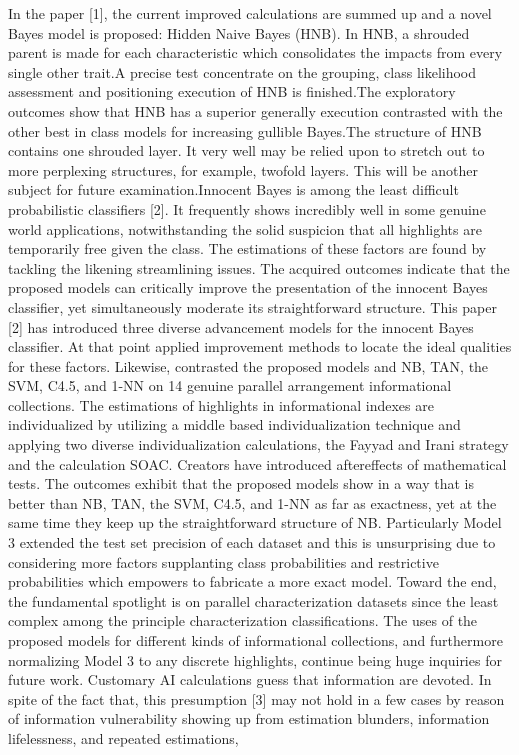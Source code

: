\documentclass[letterpaper,12pt]{article}
\begin{document}
In the paper [1], the current improved calculations are summed up and a novel Bayes model is proposed: Hidden Naive Bayes (HNB). In HNB, a shrouded parent is made for each characteristic which consolidates the impacts from every single other trait.A precise test concentrate on the grouping, class likelihood assessment and positioning execution of HNB is finished.The exploratory outcomes show that HNB has a superior generally execution contrasted with the other best in class models for increasing gullible Bayes.The structure of HNB contains one shrouded layer. It very well may be relied upon to stretch out to more perplexing structures, for example, twofold layers. This will be another subject for future examination.Innocent Bayes is among the least difficult probabilistic classifiers [2]. It frequently shows incredibly well in some genuine world applications, notwithstanding the solid suspicion that all highlights are temporarily free given the class. The estimations of these factors are found by tackling the likening streamlining issues. The acquired outcomes indicate that the proposed models can critically improve the presentation of the innocent Bayes classifier, yet simultaneously moderate its straightforward structure. This paper [2] has introduced three diverse advancement models for the innocent Bayes classifier. At that point applied improvement methods to locate the ideal qualities for these factors. Likewise, contrasted the proposed models and NB, TAN, the SVM, C4.5, and 1-NN on 14 genuine parallel arrangement informational collections. The estimations of highlights in informational indexes are individualized by utilizing a middle based individualization technique and applying two diverse individualization calculations, the Fayyad and Irani strategy and the calculation SOAC. Creators have introduced aftereffects of mathematical tests. The outcomes exhibit that the proposed models show in a way that is better than NB, TAN, the SVM, C4.5, and 1-NN as far as exactness, yet at the same time they keep up the straightforward structure of NB. Particularly Model 3 extended the test set precision of each dataset and this is unsurprising due to considering more factors supplanting class probabilities and restrictive probabilities which empowers to fabricate a more exact model. Toward the end, the fundamental spotlight is on parallel characterization datasets since the least complex among the principle characterization classifications. The uses of the proposed models for different kinds of informational collections, and furthermore normalizing Model 3 to any discrete highlights, continue being huge inquiries for future work. Customary AI calculations guess that information are devoted. In spite of the fact that, this presumption [3] may not hold in a few cases by reason of information vulnerability showing up from estimation blunders, information lifelessness, and repeated estimations, 
\end{document}
